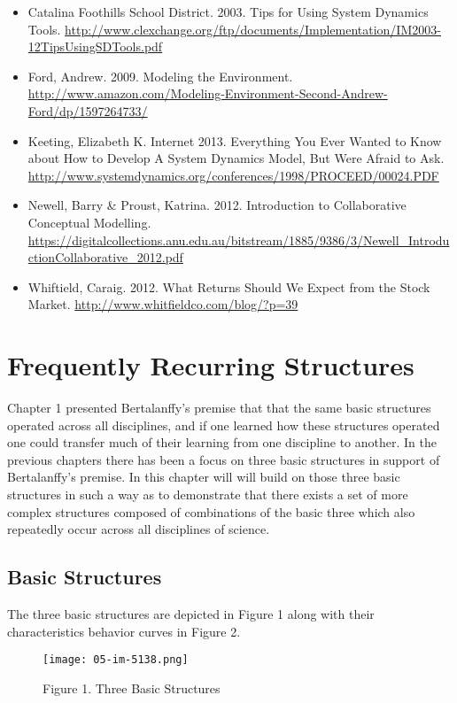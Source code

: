 \documentclass[]{memoir}
\let\Oldincludegraphics\includegraphics
\renewcommand{\includegraphics}[1]{\Oldincludegraphics[max size={\textwidth}{\textheight}]{#1}}
\begin{document}
\begin{itemize}
\itemsep1pt\parskip0pt
\item
  Catalina Foothills School District. 2003. Tips for Using System
  Dynamics Tools.
  \url{http://www.clexchange.org/ftp/documents/Implementation/IM2003-12TipsUsingSDTools.pdf}
\item
  Ford, Andrew. 2009. Modeling the Environment.
  \url{http://www.amazon.com/Modeling-Environment-Second-Andrew-Ford/dp/1597264733/}
\item
  Keeting, Elizabeth K. Internet 2013. Everything You Ever Wanted to
  Know about How to Develop A System Dynamics Model, But Were Afraid to
  Ask.
  \url{http://www.systemdynamics.org/conferences/1998/PROCEED/00024.PDF}
\item
  Newell, Barry \& Proust, Katrina. 2012. Introduction to Collaborative
  Conceptual Modelling.
  \url{https://digitalcollections.anu.edu.au/bitstream/1885/9386/3/Newell_IntroductionCollaborative_2012.pdf}
\item
  Whiftield, Caraig. 2012. What Returns Should We Expect from the Stock
  Market. \url{http://www.whitfieldco.com/blog/?p=39}
\end{itemize}

\chapter{Frequently Recurring Structures}

Chapter 1 presented Bertalanffy's premise that that the same basic
structures operated across all disciplines, and if one learned how these
structures operated one could transfer much of their learning from one
discipline to another. In the previous chapters there has been a focus
on three basic structures in support of Bertalanffy's premise. In this
chapter will will build on those three basic structures in such a way as
to demonstrate that there exists a set of more complex structures
composed of combinations of the basic three which also repeatedly occur
across all disciplines of science.

\section{Basic Structures}

The three basic structures are depicted in Figure 1 along with their
characteristics behavior curves in Figure 2.

\begin{figure}[htbp]
\centering
\texttt{[image: 05-im-5138.png]}
\caption{Figure 1. Three Basic Structures}
\end{figure}
\end{document}
